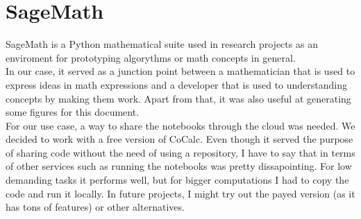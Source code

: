 \section{SageMath}

SageMath\cite{Sage} is a Python mathematical suite used in research projects as
an enviroment for prototyping algorythms or math concepts in general.\\

In our case, it served as a junction point between a mathematician that is used
to express ideas in math expressions and a developer that is used to
understanding concepts by making them work. Apart from that, it was also
useful at generating some figures for this document.\\

For our use case, a way to share the notebooks through the cloud was needed.
We decided to work with a free version of CoCalc\cite{cocalc}. Even though it
served the purpose of sharing code without the need of using a repository,
I have to say that in terms of other services such as running the notebooks
was pretty dissapointing. For low demanding tasks it performs well, but for
bigger computations I had to copy the code and run it locally. In future
projects, I might try out the payed version (as it has tons of features)
or other alternatives.\\

